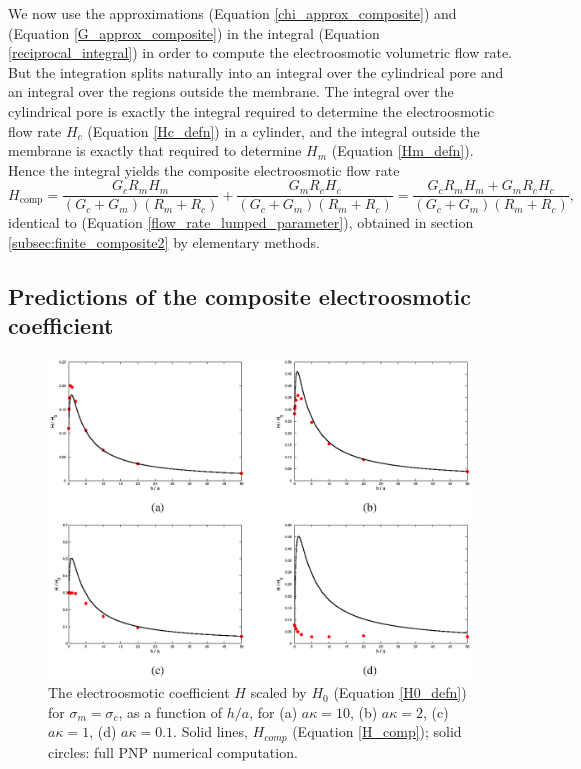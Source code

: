 We now use the approximations (Equation \ref{chi_approx_composite}) and
(Equation \ref{G_approx_composite}) in the integral (Equation \ref{reciprocal_integral}) in order to
compute the electroosmotic volumetric flow rate. But the integration
splits naturally into an integral over the cylindrical pore and an
integral over the regions outside the membrane. The integral over the
cylindrical pore is exactly the integral required to determine
the electroosmotic flow rate $H_c$ (Equation \ref{Hc_defn}) in a cylinder, and the
integral outside the membrane is exactly that required to determine
$H_m$ (Equation \ref{Hm_defn}). Hence the integral yields the composite
electroosmotic flow rate
\begin{equation}
H_\text{comp}= \frac{G_cR_mH_m}{(G_c+G_m)(R_m+R_c)}
+\frac{G_mR_cH_c}{(G_c+G_m)(R_m+R_c)}
=\frac{G_cR_mH_m+G_mR_cH_c}{(G_c+G_m)(R_m+R_c)},
\end{equation}
identical to (Equation \ref{flow_rate_lumped_parameter}), obtained in section \ref{subsec:finite_composite2} by
elementary methods.

\subsection{Predictions of the composite electroosmotic coefficient}
\begin{figure}[H]
\begin{center}
\includegraphics[width=\textwidth]{finite_thickness/finite_pore_pic3.eps}
\caption{\label{Fig:H_comp}
The electroosmotic coefficient $H$ scaled by $H_0$ (Equation \ref{H0_defn}) for
$\sigma_m=\sigma_c$, as a function of $h/a$, for
(a) $a\kappa=10$, (b) $a\kappa=2$, (c) $a\kappa=1$,
 (d) $a\kappa=0.1$.
Solid lines, $H_{comp}$ (Equation \ref{H_comp});
solid circles: full PNP numerical computation.}
\end{center}
\end{figure}

